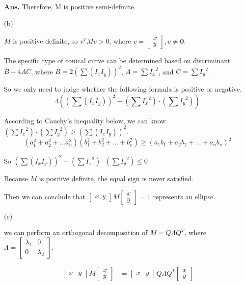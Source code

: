 \documentclass[12pt, a4paper, UTF8, fontset=windows]{ctexbook}
\newenvironment{solution}{\par\noindent\textbf{Ans.}}{\par}
\begin{document}
\begin{solution}
    Therefore, M is positive semi-definite.

    (b) 

    $M$ is positive definite, so $v^T M v > 0$, where $v = \begin{bmatrix} x \\ y \end{bmatrix}, v \neq \mathbf{0}$.

    The specific type of conical curve can be determined based on discriminant $B - 4AC$, where $B=2(\sum(I_x I_y))^2$, $A=\sum{I_x}^2$, and $C=\sum{I_y}^2$.

    So we only need to judge whether the following formula is positive or negative.
    $$
    4((\sum(I_x I_y))^2 - (\sum{I_x}^2) \cdot (\sum{I_y}^2))
    $$

    According to Cauchy's inequality below, we can know $(\sum{I_x}^2) \cdot (\sum{I_y}^2) \geq (\sum(I_x I_y))^2$.
    $$
    \left(a_{1}^{2}+a_{2}^{2}+\ldots a_{n}^{2}\right)\left(b_{1}^{2}+b_{2}^{2}+\ldots+b_{n}^{2}\right) \geq\left(a_{1} b_{1}+a_{2} b_{2}+\ldots+a_{n} b_{n}\right)^{2}
    $$

    So $(\sum(I_x I_y))^2 - (\sum{I_x}^2) \cdot (\sum{I_y}^2) \leq 0$

    Because $M$ is positive definite, the equal sign is never satisfied.

    Then we can conclude that
    $
    \left[\begin{array}{l}
        x, y 
    \end{array}\right] 
    M
    \left[\begin{array}{l} x \\ y \end{array}\right]
    =
    1
    $ 
    represents an ellipse.

    (c)
    
    we can perform an orthogonal decomposition of $M = Q \Lambda Q^T$, 
    where 
    $
    \Lambda = 
    \begin{bmatrix}
    \lambda_1 & 0 \\
    0 & \lambda_2
    \end{bmatrix}
    $.

    $$
    \begin{aligned}
        \begin{bmatrix}
            x & y 
        \end{bmatrix}
        M
        \begin{bmatrix}
            x \\ y 
        \end{bmatrix}
        &=
        \begin{bmatrix}
            x & y 
        \end{bmatrix}
        Q
        \Lambda
        Q^T
        \begin{bmatrix}
            x \\ y 
        \end{bmatrix}
    \end{aligned}
    $$
    

\end{solution}
\end{document}
